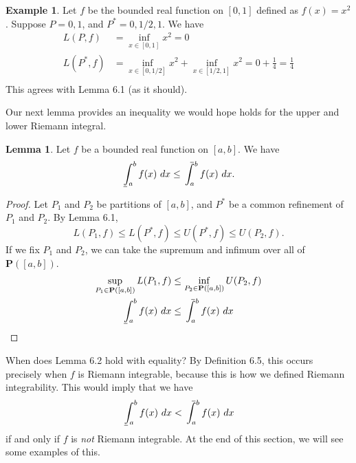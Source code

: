 \documentclass{article}
\def\upint{\mathchoice%
	{\mkern13mu\overline{\vphantom{\intop}\mkern7mu}\mkern-20mu}%
	{\mkern7mu\overline{\vphantom{\intop}\mkern7mu}\mkern-14mu}%
	{\mkern7mu\overline{\vphantom{\intop}\mkern7mu}\mkern-14mu}%
	{\mkern7mu\overline{\vphantom{\intop}\mkern7mu}\mkern-14mu}%
	\int}
\def\lowint{\mkern3mu\underline{\vphantom{\intop}\mkern7mu}\mkern-10mu\int}
\theoremstyle{definition}
\newtheorem{lemma}{Lemma}[section]
\newtheorem{example}{Example}[section]
\begin{document}
	\begin{example}
		Let $ f $ be the bounded real function on $ [0,1] $ defined as $ f(x)=x^2 $. Suppose $ P={0,1} $, and $ P^*={0,1/2,1} $. We have \begin{align*}
			L(P,f)&=\inf\limits_{x\in[0,1]}x^2=0\\
			L(P^*,f)&=\inf\limits_{x\in[0,1/2]}x^2+\inf\limits_{x\in[1/2,1]}x^2=0+\frac{1}{4}=\frac{1}{4}\\
		\end{align*}
		This agrees with Lemma 6.1 (as it should).
	\end{example}
	Our next lemma provides an inequality we would hope holds for the upper and lower Riemann integral.
	\begin{lemma}
		Let $ f $ be a bounded real function on $ [a,b] $. We have 
		$$\lowint_{a}^bf(x)\ dx\le \upint_{a}^bf(x)\ dx.$$
	\end{lemma}
	\begin{proof}
		Let $ P_1 $ and $ P_2 $ be partitions of $ [a,b] $, and $ P^* $ be a common refinement of $ P_1 $ and $ P_2 $. By Lemma 6.1,
		$$ L(P_1,f)\le L(P^*,f)\le U(P^*,f)\le U(P_2,f).$$ If we fix $ P_1 $ and $ P_2 $, we can take the supremum and infimum over all of $ \mathbf{P}([a,b]) $. 
		\begin{align*}
			\sup\limits_{P_1\in\textbf{P}([a,b])}	L(P_1,f)&\le \inf\limits_{P_2\in\textbf{P}([a,b])}U(P_2,f)\\\lowint_{a}^bf(x)\ dx&\le \upint_{a}^bf(x)\ dx
		\end{align*}
	\end{proof}
	When does Lemma 6.2 hold with equality? By Definition 6.5, this occurs precisely when $ f $ is Riemann integrable, because this is how we defined Riemann integrability. This would imply that we have $$\lowint_{a}^bf(x)\ dx< \upint_{a}^bf(x)\ dx $$ if and only if $ f $ is \textit{not} Riemann integrable. At the end of this section, we will see some examples of this.
	
\end{document}

